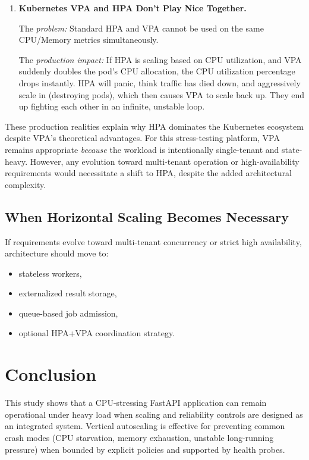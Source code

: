 \documentclass[11pt,a4paper]{article}
\begin{document}
\begin{enumerate}[leftmargin=1.5em]
	The \emph{production impact:} If 2 pods are scaled via VPA and one crashes due to a bug or memory leak, 50\% of compute capacity is lost. If 10 pods are managed by HPA, losing one pod only drops capacity by 10\%, making it trivial for the rest of the cluster to absorb the traffic.

	\item \textbf{Kubernetes VPA and HPA Don't Play Nice Together.}
	
	The \emph{problem:} Standard HPA and VPA cannot be used on the same CPU/Memory metrics simultaneously.
	
	The \emph{production impact:} If HPA is scaling based on CPU utilization, and VPA suddenly doubles the pod's CPU allocation, the CPU utilization percentage drops instantly. HPA will panic, think traffic has died down, and aggressively scale in (destroying pods), which then causes VPA to scale back up. They end up fighting each other in an infinite, unstable loop.
\end{enumerate}

These production realities explain why HPA dominates the Kubernetes ecosystem despite VPA's theoretical advantages. For this stress-testing platform, VPA remains appropriate \emph{because} the workload is intentionally single-tenant and state-heavy. However, any evolution toward multi-tenant operation or high-availability requirements would necessitate a shift to HPA, despite the added architectural complexity.

\subsection{When Horizontal Scaling Becomes Necessary}
If requirements evolve toward multi-tenant concurrency or strict high availability, architecture should move to:

\begin{itemize}[leftmargin=1.5em]
	\item stateless workers,
	\item externalized result storage,
	\item queue-based job admission,
	\item optional HPA+VPA coordination strategy.
\end{itemize}

\section{Conclusion}
This study shows that a CPU-stressing FastAPI application can remain operational under heavy load when scaling and reliability controls are designed as an integrated system. Vertical autoscaling is effective for preventing common crash modes (CPU starvation, memory exhaustion, unstable long-running pressure) when bounded by explicit policies and supported by health probes.
\end{document}
